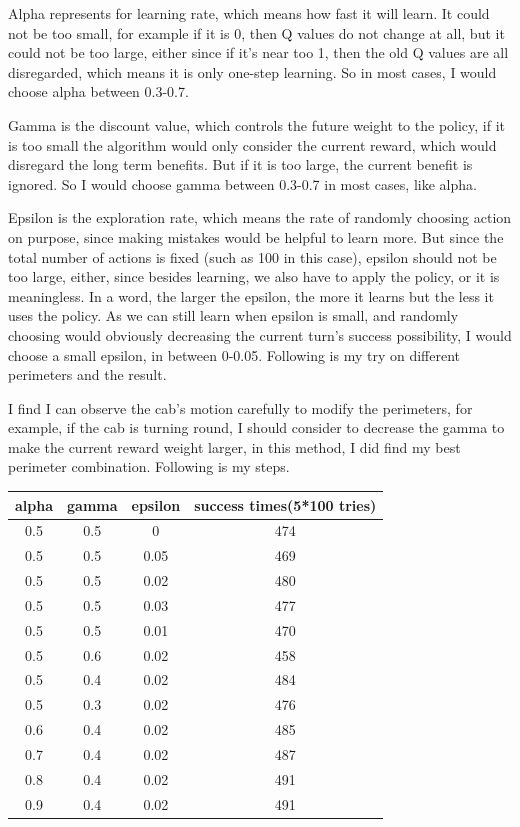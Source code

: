 \documentclass[11pt,a4paper]{article}
\begin{document}
\noindent Alpha represents for learning rate, which means how fast it will learn. It could not be too small, for example if it is 0, then Q values do not change at all, but it could not be too large, either since if it’s near too 1, then the old Q values are all disregarded, which means it is only one-step learning. So in most cases, I would choose alpha between 0.3-0.7.

\noindent Gamma is the discount value, which controls the future weight to the policy, if it is too small the algorithm would only consider the current reward, which would disregard the long term benefits. But if it is too large, the current benefit is ignored. So I would choose gamma between 0.3-0.7 in most cases, like alpha.

\noindent Epsilon is the exploration rate, which means the rate of randomly choosing action on purpose, since making mistakes would be helpful to learn more. But since the total number of actions is fixed (such as 100 in this case), epsilon should not be too large, either, since besides learning, we also have to apply the policy, or it is meaningless. In a word, the larger the epsilon, the more it learns but the less it uses the policy. As we can still learn when epsilon is small, and randomly choosing would obviously decreasing the current turn’s success possibility, I would choose a small epsilon, in between 0-0.05. Following is my try on different perimeters and the result.

\vspace{3mm}
\noindent I find I can observe the cab's motion carefully to modify the perimeters, for example, if the cab is turning round, I should consider to decrease the gamma to make the current reward weight larger, in this method, I did find my best perimeter combination. Following is my steps.

\begin{table}[!htbp]
\centering
\begin{tabular}{|c|c|c|c|}

\hline alpha & gamma & epsilon&success times(5*100 tries)\\
\hline 0.5&0.5&0&474\\
\hline 0.5&0.5&0.05&469\\
\hline 0.5&0.5&0.02&480\\
\hline 0.5&0.5&0.03&477\\
\hline 0.5&0.5&0.01&470\\
\hline 0.5&0.6&0.02&458\\
\hline 0.5&0.4&0.02&484\\
\hline 0.5&0.3&0.02&476\\
\hline 0.6&0.4&0.02&485\\
\hline 0.7&0.4&0.02&487\\
\hline 0.8&0.4&0.02&491\\
\hline 0.9&0.4&0.02&491\\
\hline
\end{tabular}
\end{table}
\end{document}
